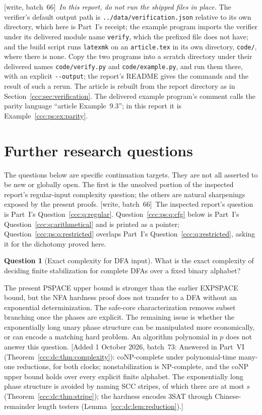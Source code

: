\documentclass[11pt,letterpaper]{article}
\theoremstyle{definition}
\newtheorem{question}[theorem]{Question}
\theoremstyle{remark}
\newcommand{\wsix}{\textup{[write, batch~66]}}
\newcommand{\waddsevthree}[1]{\textup{[}Added 1 October 2026, batch~73: #1\textup{]}}
\begin{document}
\wsix\ \emph{In this report, do not run the shipped files in place.} The
verifier's default output path is \nolinkurl{../data/verification.json}
relative to its own directory, which here is Part~I's receipt; the example
program imports the verifier under its delivered module name
\texttt{verify}, which the prefixed file does not have; and the build script
runs \texttt{latexmk} on an \texttt{article.tex} in its own directory,
\texttt{code/}, where there is none. Copy the two programs into a scratch
directory under their delivered names \texttt{code/verify.py} and
\texttt{code/example.py}, and run them there, with an explicit
\texttt{-{}-output}; the report's README gives the commands and the result of
such a rerun. The article is rebuilt from the report directory as in
Section~\ref{ccc:sec:verification}. The delivered example program's comment
calls the parity language ``article Example~9.3''; in this report it is
Example~\ref{ccc:ps:ex:parity}.

\section{Further research questions}\label{ccc:ps:sec:questions}

The questions below are specific continuation targets. They are not all
asserted to be new or globally open. The first is the unsolved portion of
the inspected report's regular-input complexity question; the others are
natural sharpenings exposed by the present proofs.
\wsix\ The inspected report's question is Part~I's
Question~\ref{ccc:q:regular}. Question~\ref{ccc:ps:q:cfg} below is Part~I's
Question~\ref{ccc:q:arithmetical} and is printed as a pointer;
Question~\ref{ccc:ps:q:restricted} overlaps Part~I's
Question~\ref{ccc:q:restricted}, asking it for the dichotomy proved here.

\begin{question}[Exact complexity for DFA input]\label{ccc:ps:q:dfa}
What is the exact complexity of deciding finite stabilization for complete
DFAs over a fixed binary alphabet?
\end{question}
The present PSPACE upper bound is stronger than the earlier EXPSPACE
bound, but the NFA hardness proof does not transfer to a DFA without an
exponential determinization. The safe-core characterization removes
subset branching once the phases are explicit. The remaining issue is
whether the exponentially long unary phase structure can be manipulated
more economically, or can encode a matching hard problem. An algorithm
polynomial in $p$ does not answer this question.
\waddsevthree{Answered in Part~VI (Theorem~\ref{ccc:dc:thm:complexity}):
coNP-complete under polynomial-time many-one reductions, for both clocks;
nonstabilization is NP-complete, and the coNP upper bound holds over every
explicit finite alphabet. The exponentially long phase structure is avoided
by naming SCC stripes, of which there are at most $s$
(Theorem~\ref{ccc:dc:thm:stripe}); the hardness encodes 3SAT through
Chinese-remainder length testers (Lemma~\ref{ccc:dc:lem:reduction}).}
\end{document}
